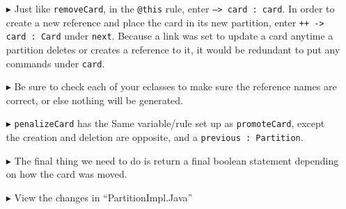 \begin{itemize}
\item[$\blacktriangleright$] Just like \texttt{removeCard}, in the \texttt{@this} rule, enter  \texttt{--> card : card}. In order to create a new reference and
place the card in its new partition, enter  \texttt{++ -> card : Card} under \texttt{next}. Because a link was set to update a card anytime a partition
deletes or creates a reference to it, it would be redundant to put any commands under \texttt{card}.

\item[$\blacktriangleright$] Be sure to check each of your eclasses to make sure the reference names are correct, or else nothing will be generated.	

\item[$\blacktriangleright$] \texttt{penalizeCard} has the Same variable/rule set up as \texttt{promoteCard}, except the creation and deletion are opposite,
and a \texttt{previous : Partition}.

\item[$\blacktriangleright$] The final thing we need to do is return a final boolean statement depending on how the card was moved.

\item[$\blacktriangleright$] View the changes in ``PartitionImpl.Java''

 \end{itemize}
 